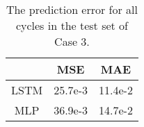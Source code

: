 \begin{table}[ht!]
    \centering
    \caption{The prediction error for all cycles in the test set of Case 3.}
    \begin{tabular}{c | c c}
                    & \ac{MSE}  & \ac{MAE}  \\ \hline
        \ac{LSTM}   & 25.7e-3         & 11.4e-2         \\
        \ac{MLP}    & 36.9e-3         & 14.7e-2
    \end{tabular}
    \label{tab:case3-test-eval}
\end{table}